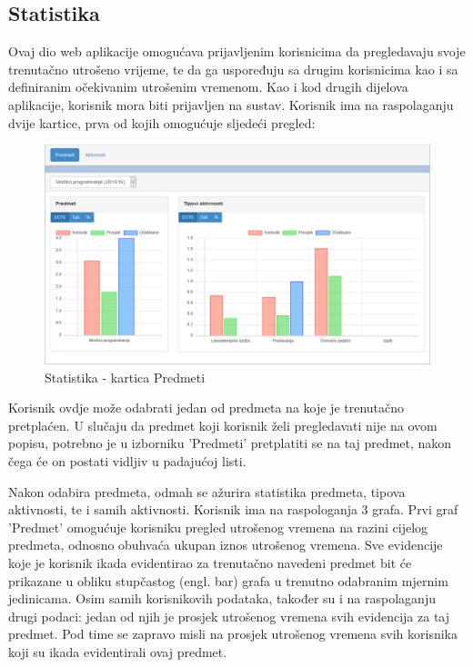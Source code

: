 \documentclass[times, utf8, zavrsni]{fer}
\begin{document}
\subsection{Statistika}
Ovaj dio web aplikacije omogućava prijavljenim korisnicima da pregledavaju svoje trenutačno utrošeno vrijeme, te da ga uspoređuju sa drugim korisnicima kao i sa definiranim očekivanim utrošenim vremenom. Kao i kod drugih dijelova aplikacije, korisnik mora biti prijavljen na sustav. Korisnik ima na raspolaganju dvije kartice, prva od kojih omogućuje sljedeći pregled:

\begin{figure}[H]
\centering
\includegraphics[width=\textwidth,height=\textheight,keepaspectratio]{img/statistika-web.png}
\caption{Statistika - kartica Predmeti}
\label{fig:statistika-web}
\end{figure}

Korisnik ovdje može odabrati jedan od predmeta na koje je trenutačno pretplaćen. U slučaju da predmet koji korisnik želi pregledavati nije na ovom popisu, potrebno je u izborniku 'Predmeti' pretplatiti se na taj predmet, nakon čega će on postati vidljiv u padajućoj listi.

Nakon odabira predmeta, odmah se ažurira statistika predmeta, tipova aktivnosti, te i samih aktivnosti. Korisnik ima na raspologanja 3 grafa. Prvi graf 'Predmet' omogućuje korisniku pregled utrošenog vremena na razini cijelog predmeta, odnosno obuhvaća ukupan iznos utrošenog vremena. Sve evidencije koje je korisnik ikada evidentirao za trenutačno navedeni predmet bit će prikazane u obliku stupčastog (engl. bar) grafa u trenutno odabranim mjernim jedinicama. Osim samih korisnikovih podataka, također su i na raspolaganju drugi podaci: jedan od njih je prosjek utrošenog vremena svih evidencija za taj predmet. Pod time se zapravo misli na prosjek utrošenog vremena svih korisnika koji su ikada evidentirali ovaj predmet.
\end{document}
